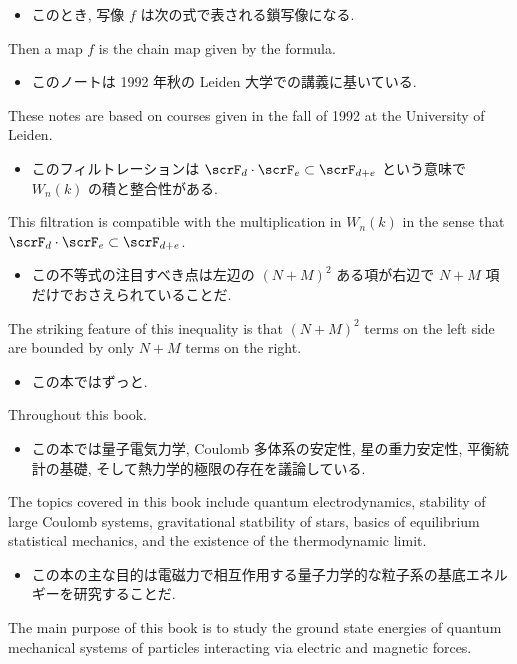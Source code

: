 \documentclass[openany, a4paper, oneside]{jsbook}
\begin{document}
\begin{itemize}
\item このとき, 写像 $f$ は次の式で表される鎖写像になる. \cite{CharlesWeibel1}
\end{itemize}
Then a map $f$ is the chain map given by the formula.

\begin{itemize}
\item このノートは 1992 年秋の Leiden 大学での講義に基いている. \cite{ChrisPeters1}
\end{itemize}
These notes are based on courses given in the fall of 1992 at the University of Leiden.

\begin{itemize}
\item このフィルトレーションは $\scrF_d \cdot \scrF_e \subset \scrF_{d+e}$ という意味で $W_n(k)$ の積と整合性がある.
\end{itemize}
This filtration is compatible with the multiplication in $W_n(k)$
in the sense that $\scrF_d \cdot \scrF_e \subset \scrF_{d+e}$.

\begin{itemize}
\item この不等式の注目すべき点は左辺の $(N+M)^2$ ある項が右辺で $N+M$ 項だけでおさえられていることだ. \cite{LiebSeiringer1}
\end{itemize}
The striking feature of this inequality is that $(N+M)^2$ terms on the left side are bounded
by only $N+M$ terms on the right.

\begin{itemize}
\item この本ではずっと. \cite{AltmanKleiman1}
\end{itemize}
Throughout this book.

\begin{itemize}
\item この本では量子電気力学, Coulomb 多体系の安定性, 星の重力安定性, 平衡統計の基礎, そして熱力学的極限の存在を議論している. \cite{LiebSeiringer1}
\end{itemize}
The topics covered in this book include quantum electrodynamics, stability of large Coulomb systems,
gravitational statbility of stars, basics of equilibrium statistical mechanics,
and the existence of the thermodynamic limit.

\begin{itemize}
\item この本の主な目的は電磁力で相互作用する量子力学的な粒子系の基底エネルギーを研究することだ. \cite{LiebSeiringer1}
\end{itemize}
The main purpose of this book is to study the ground state energies of quantum mechanical systems of
particles interacting via electric and magnetic forces.
\end{document}
